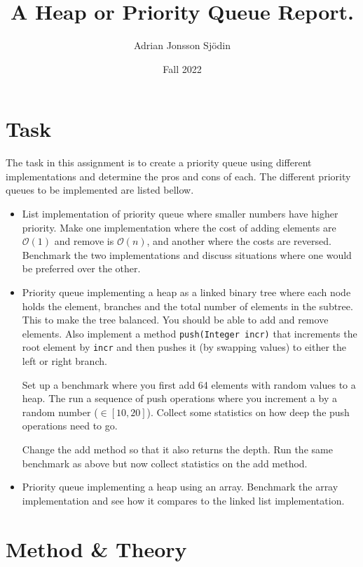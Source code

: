 \documentclass[a4paper,11pt]{article}
\begin{document}
\title{
    \textbf{A Heap or Priority Queue Report.}
}
\author{Adrian Jonsson Sjödin}
\date{Fall 2022}

\maketitle

\section{Task}
\label{task}
The task in this assignment is to create a priority queue using different implementations and determine
the pros and cons of each. The different priority queues to be implemented are listed bellow.
\begin{itemize}
    \item List implementation of priority queue where smaller numbers have higher priority. Make one implementation
    where the cost of adding elements are $\mathcal{O}(1)$ and remove is $\mathcal{O}(n)$, and another where the costs are reversed.
    Benchmark the two implementations and discuss situations where one would be preferred over the other.
    
    \item Priority queue implementing a heap as a linked binary tree where each node holds the element, branches and 
    the total number of elements in the subtree. This to make the tree balanced. You should be able to add and remove elements.
    Also implement a method {\tt push(Integer incr)} that increments the root element by {\tt incr} and then pushes it (by swapping 
    values) to either the left or right branch.

    Set up a benchmark where you first add 64 elements with random values to a heap. The run a sequence of push operations 
    where you increment a by a random number ($\in[10,20]$). Collect some statistics on how deep the push operations need to go.
    
    Change the add method so that it also returns the depth. Run the same benchmark as above but now collect statistics on the 
    add method.

    \item Priority queue implementing a heap using an array. Benchmark the array implementation and see how it compares to the 
     linked list implementation.

\end{itemize}

\section{Method \& Theory}
\label{method}
\end{document}
